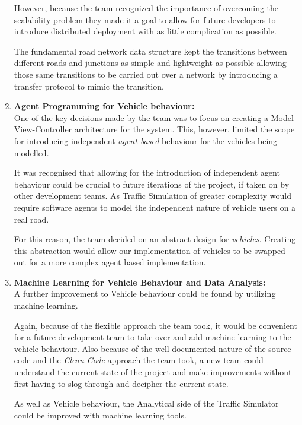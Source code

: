 \documentclass[11pt]{article}
\begin{document}
\begin{enumerate}
	However, because the team recognized the importance of overcoming the scalability problem they made it a goal to allow for future developers to introduce distributed deployment with as little complication as possible.
	
	The fundamental road network data structure kept the transitions between different roads and junctions as simple and lightweight as possible allowing those same transitions to be carried out over a network by introducing a transfer protocol to mimic the transition.\\
	
	\item \textbf{Agent Programming for Vehicle behaviour:}
	\\
	
	One of the key decisions made by the team was to focus on creating a Model-View-Controller architecture for the system. This, however, limited the scope for introducing independent \textit{agent based} behaviour for the vehicles being modelled.
	
	It was recognised that allowing for the introduction of independent agent behaviour could be crucial to future iterations of the project, if taken on by other development teams. As Traffic Simulation of greater complexity would require software agents to model the independent nature of vehicle users on a real road.
	
	For this reason, the team decided on an abstract design for \textit{vehicles}. Creating this abstraction would allow our implementation of vehicles to be swapped out for a more complex agent based implementation.\\
	
	\item \textbf{Machine Learning for Vehicle Behaviour and Data Analysis:}
	\\
	
	A further improvement to Vehicle behaviour could be found by utilizing machine learning.
	
	Again, because of the flexible approach the team took, it would be convenient for a future development team to take over and add machine learning to the vehicle behaviour. Also because of the well documented nature of the source code and the \textit{Clean Code} \cite{MartinRC08} approach the team took, a new team could understand the current state of the project and make improvements without first having to slog through and decipher the current state.
	
	As well as Vehicle behaviour, the Analytical side of the Traffic Simulator could be improved with machine learning tools.
	

\end{enumerate}
\end{document}
